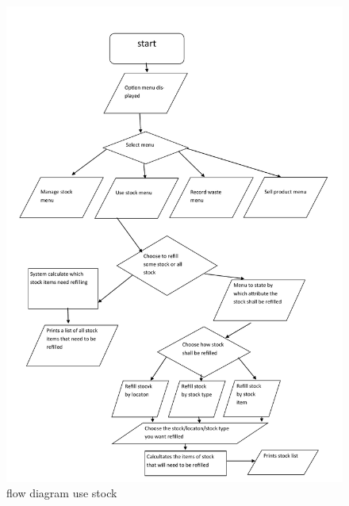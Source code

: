 \begin{figure}[H]
    \includegraphics[width=\textwidth]{./Design/pdfimages/flowdiagram_use_stock.pdf}
    \caption{flow diagram use stock} \label{fig:use stock flowdiagram}
\end{figure}

